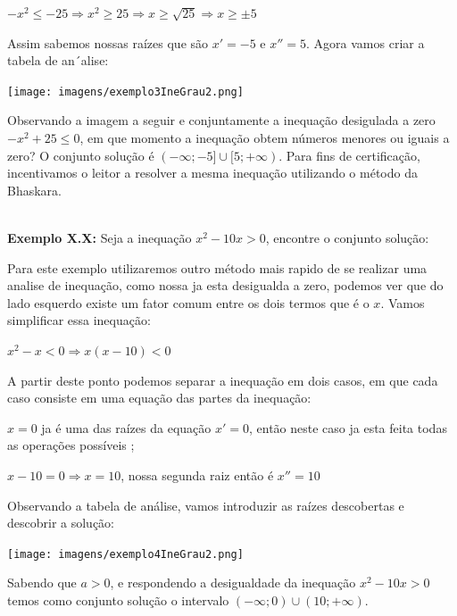\documentclass[a4paper,12pt,twoside,BCOR=10mm]{scrbook}
\begin{document}
\begin{titlepage}
\begin{itemize}
\begin{center}
\item[] $-x^{2} \leq -25 \Rightarrow x^{2} \geq 25 \Rightarrow x \geq \sqrt{25} \Rightarrow x \geq \pm 5$
\end{center}
\item Assim sabemos nossas raízes que são $x' = -5$ e $x'' = 5$. Agora vamos criar a tabela de an´alise:
\begin{flushleft}
	\texttt{[image: imagens/exemplo3IneGrau2.png]}
\end{flushleft}
\item Observando a imagem a seguir e conjuntamente a inequação desigulada a zero $-x^{2} +25 \leq 0$, em que momento a inequação obtem números menores ou iguais a zero? O conjunto solução é $(-\infty ; -5]\cup[5 ; +\infty)$. Para fins de certificação, incentivamos o leitor a resolver a mesma inequação utilizando o método da Bhaskara.
\end{itemize}

\\
\textbf{Exemplo X.X:} Seja a inequação $x^{2} - 10x > 0$, encontre o conjunto solução: 
\\	
\begin{itemize}
\item Para este exemplo utilizaremos outro método mais rapido de se realizar uma analise de inequação, como nossa ja esta desigualda a zero, podemos ver que do lado esquerdo existe um fator comum entre os dois termos que é o $x$. Vamos simplificar essa inequação:
\begin{center}
\item[] $x^{2} - x < 0 \Rightarrow x(x - 10) < 0 $
\end{center}
\item A partir deste ponto podemos separar a inequação em dois casos, em que cada caso consiste em uma equação das partes da inequação:
\item[\textbf{Caso 1}] $x = 0$ ja é uma das raízes da equação $x' = 0$, então neste caso ja esta feita todas as operações possíveis ;
\item[\textbf{Caso 2}] $x - 10 = 0 \Rightarrow x = 10$, nossa segunda raiz então é $x'' = 10$
\item Observando a tabela de análise, vamos introduzir as raízes descobertas e descobrir a solução: 
\begin{flushleft}
	\texttt{[image: imagens/exemplo4IneGrau2.png]}
\end{flushleft}
\item Sabendo que $a > 0$, e respondendo a desigualdade da inequação $x^{2} - 10x > 0$ temos como conjunto solução o intervalo $(-\infty ; 0)\cup(10 ; +\infty)$.
\end{itemize}


\end{titlepage}
\end{document}
